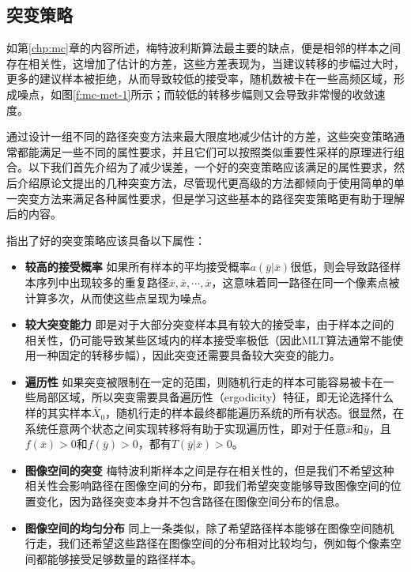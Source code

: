 \subsection{突变策略}\label{sec:mlt-mutations}
如第\ref{chp:mc}章的内容所述，梅特波利斯算法最主要的缺点，便是相邻的样本之间存在相关性，这增加了估计的方差，这些方差表现为，当建议转移的步幅过大时，更多的建议样本被拒绝，从而导致较低的接受率，随机数被卡在一些高频区域，形成噪点，如图\ref{f:mc-met-1}所示；而较低的转移步幅则又会导致非常慢的收敛速度。

\cite{a:MetropolisLightTransport}通过设计一组不同的路径突变方法来最大限度地减少估计的方差，这些突变策略通常都能满足一些不同的属性要求，并且它们可以按照类似重要性采样的原理进行组合。以下我们首先介绍为了减少误差，一个好的突变策略应该满足的属性要求，然后介绍原论文提出的几种突变方法，尽管现代更高级的方法都倾向于使用简单的单一突变方法来满足各种属性要求，但是学习这些基本的路径突变策略更有助于理解后的内容。

\cite{a:MetropolisLightTransport}指出了好的突变策略应该具备以下属性：

\begin{itemize}
	\item \textbf{较高的接受概率 }如果所有样本的平均接受概率$a(\bar{y}|\bar{x})$很低，则会导致路径样本序列中出现较多的重复路径$\bar{x},\bar{x},\cdots,\bar{x}$，这意味着同一路径在同一个像素点被计算多次，从而使这些点呈现为噪点。
	\item \textbf{较大突变能力 }即是对于大部分突变样本具有较大的接受率，由于样本之间的相关性，仍可能导致某些区域内的样本接受率极低（因此MLT算法通常不能使用一种固定的转移步幅），因此突变还需要具备较大突变的能力。
	\item \textbf{遍历性 }如果突变被限制在一定的范围，则随机行走的样本可能容易被卡在一些局部区域，所以突变需要具备遍历性（ergodicity）特征，即无论选择什么样的其实样本$\bar{X}_0$，随机行走的样本最终都能遍历系统的所有状态。很显然，在系统任意两个状态之间实现转移将有助于实现遍历性，即对于任意$\bar{x}$和$\bar{y}$，且$f(\bar{x})>0$和$f(\bar{y})>0$，都有$T(\bar{y}|\bar{x})>0$。
	\item \textbf{图像空间的突变 }梅特波利斯样本之间是存在相关性的，但是我们不希望这种相关性会影响路径在图像空间的分布，即我们希望突变能够导致图像空间的位置变化，因为路径突变本身并不包含路径在图像空间分布的信息。
	\item \textbf{图像空间的均匀分布 }同上一条类似，除了希望路径样本能够在图像空间随机行走，我们还希望这些路径在图像空间的分布相对比较均匀，例如每个像素空间都能够接受足够数量的路径样本。
\end{itemize}

